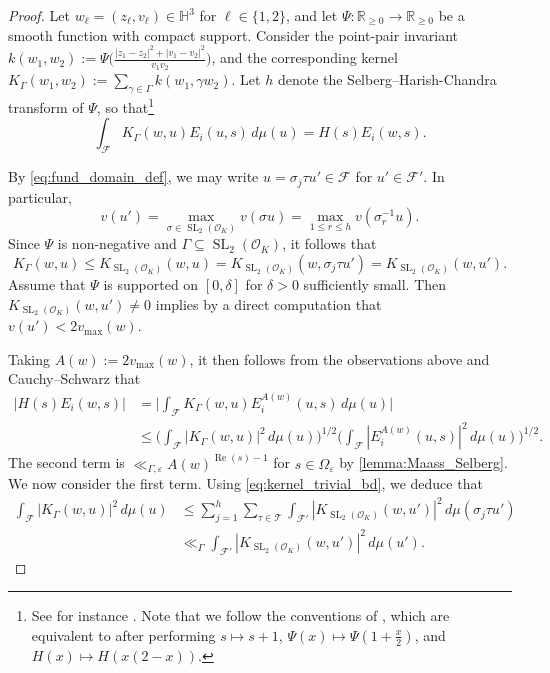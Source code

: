 \documentclass[12pt,reqno]{amsart}
\numberwithin{equation}{section}
\renewcommand{\Re}{\operatorname{Re}}
\newcommand{\R}{\mathbb{R}}
\DeclareMathOperator{\SL}{SL}
\begin{document}
\begin{proof}
    Let $w_\ell = (z_\ell, v_\ell) \in \mathbb{H}^3$ for $\ell \in \{1, 2\}$, and let $\Psi: \R_{\geq 0} \to \R_{\geq 0}$ be a smooth function with compact support. Consider the point-pair invariant $k(w_1, w_2) := \Psi\big(\frac{|{z_1-z_2}|^2+|{v_1-v_2}|^2}{v_1 v_2}\big)$, and the corresponding kernel $K_\Gamma(w_1, w_2) := \sum_{\gamma \in \Gamma} k(w_1, \gamma w_2)$. Let $h$ denote the Selberg--Harish-Chandra transform of $\Psi$, so that\footnote{See for instance \cite[\S 3.5, (5.2) and (5.3)]{EGM}. Note that we follow the conventions of \cite[(1.18)]{SarCoh}, which are equivalent to \cite[\S 1.1, Propositions 1.6 and 1.9]{EGM} after performing $s \mapsto s+1$, $\Psi(x) \mapsto \Psi(1+ \frac{x}{2})$, and $H(x) \mapsto H(x(2-x))$.}
    \begin{equation}\label{eq:Selberg_kernel}
        \int_\mathcal{F} K_\Gamma(w, u) E_i(u, s) \, d\mu(u) = H(s) E_i(w, s).
    \end{equation} 

    By \eqref{eq:fund_domain_def}, we may write $u = \sigma_j \tau u' \in \mathcal{F}$ for $u' \in \mathcal{F}'$. In particular,
    \begin{equation*}
        v(u') = \max_{\sigma \in \SL_2(\mathcal{O}_K)} v(\sigma u) = \max_{1\leq r \leq h} v(\sigma_r^{-1} u).
    \end{equation*} 
    Since $\Psi$ is non-negative and $\Gamma \subseteq \SL_2(\mathcal{O}_K)$, it follows that
    \begin{equation}\label{eq:kernel_trivial_bd}
        K_\Gamma(w, u) \leq K_{\SL_2(\mathcal{O}_K)}(w, u) = K_{\SL_2(\mathcal{O}_K)}(w, \sigma_j \tau u') = K_{\SL_2(\mathcal{O}_K)}(w, u').
    \end{equation}
    Assume that $\Psi$ is supported on $[0, \delta]$ for $\delta>0$ sufficiently small. Then $K_{\SL_2(\mathcal{O}_K)}(w, u') \neq 0$ implies by a direct computation that 
    $v(u') < 2 v_{\mathrm{max}}(w)$. 
    
    Taking $A(w) := 2 v_{\mathrm{max}}(w)$, it then follows from the observations above and Cauchy--Schwarz that 
    \begin{align*}
        |H(s) E_i(w, s)| &= \Big | \int_\mathcal{F} K_\Gamma(w, u) E^{A(w)}_i(u, s) \, d\mu(u) \Big | \\
        & \leq \Big(\int_\mathcal{F} |{K_\Gamma(w, u)}|^2 \, d\mu(u)\Big)^{1/2} \Big(\int_\mathcal{F} |{E^{A(w)}_i(u, s)}|^2 \, d\mu(u)\Big)^{1/2}.
    \end{align*}
    The second term is $\ll_{\Gamma,\varepsilon} A(w)^{\Re(s)-1}$ for $s \in \Omega_{\varepsilon}$ by \cref{lemma:Maass_Selberg}. We now consider the first term. Using \eqref{eq:kernel_trivial_bd}, we deduce that
    \begin{align*}
        \int_\mathcal{F} |{K_\Gamma(w, u)}|^2 \, d\mu(u) &\leq \sum_{j=1}^h \sum_{\tau \in \mathcal{T}} \int_\mathcal{F'} |{K_{\SL_2(\mathcal{O}_K)}(w, u')}|^2 \, d\mu(\sigma_j \tau u') \\
        &\ll_\Gamma \int_\mathcal{F'} |{K_{\SL_2(\mathcal{O}_K)}(w, u')}|^2 \, d\mu(u').
    \end{align*} 


\end{proof}
\end{document}
